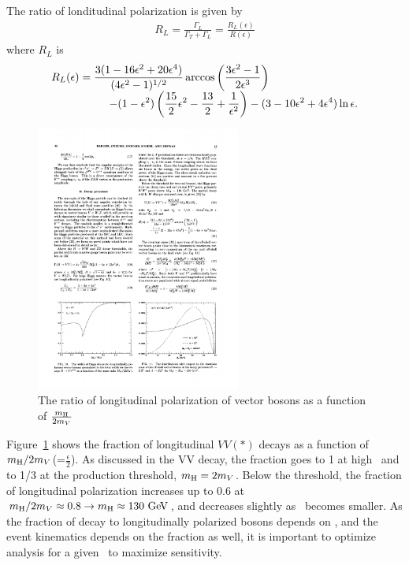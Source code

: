 The ratio of londitudinal polarization is given \cite{PhysRevD.49.79} by 
\begin{eqnarray} 
R_L 
=
\frac{\Gamma_L}{\Gamma_T + \Gamma_L}    
= 
\frac{R_L(\epsilon)}{R(\epsilon)}  
\end{eqnarray} 
where $R_L$ is \cite{PhysRevD.49.79} 
\begin{eqnarray} 
\begin{array}{ccc} \multicolumn{2}{c}{\displaystyle 
R_L(\epsilon) = \frac{3(1-16\epsilon^2+20\epsilon^4)}{(4\epsilon^2-1)^{1/2}} 
                \arccos \left( \frac{3\epsilon^2-1}{2\epsilon^3} \right)  
} & \\ & \multicolumn{2}{c}{\hspace{1.5cm} \displaystyle
- (1-\epsilon^2)\left( \frac{15}{2}\epsilon^2 - \frac{13}{2} + \frac{1}{\epsilon^2} \right)  
- (3-10\epsilon^2+4\epsilon^4) \ln \epsilon.
} \end{array}      
\end{eqnarray} 
%
\begin{figure}[t]
\centering
\includegraphics[width=0.6\textwidth]{figures/HVV_polarization_ratio.pdf}
\caption{The ratio of longitudinal polarization of vector bosons 
as a function of $\frac{m_{\mathrm{H}}}{2m_V}$ \cite{PhysRevD.49.79} }
\label{fig:HVV_polarization_ratio}
\end{figure}
Figure~\ref{fig:HVV_polarization_ratio} shows the fraction of longitudinal $VV(*)$ decays 
as a function of $m_{\mathrm{H}}/2m_V$(=$\displaystyle \frac{\epsilon}{2}$). 
As discussed in the VV decay, the fraction goes to 1 at high \mHi\ and 
to 1/3 at the production threshold, $m_{\mathrm{H}} = 2m_V$.
Below the threshold, the fraction of longitudinal polarization 
increases up to 0.6 at $m_{\mathrm{H}}/2m_V \approx 0.8 \rightarrow m_{\mathrm{H}} \approx 130~\mathrm{Ge\kern -0.1em V}$,
and decreases slightly as \mHi\ becomes smaller. 
As the fraction of decay to longitudinally polarized bosons depends on \mHi, 
and the event kinematics depends on the fraction as well, 
it is important to optimize analysis for a given \mHi\ to maximize sensitivity. 
\\ 

